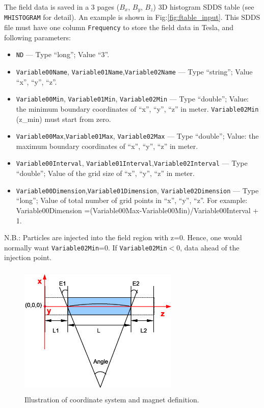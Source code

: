 The field data is saved in a 3 pages ($B_x$,
$B_y$, $B_z$) 3D histogram SDDS table (see \verb|MHISTOGRAM| for detail).
An example is shown in Fig:\ref{fig:ftable_input}.
This SDDS file must have one column \verb|Frequency| to store the
field data in Tesla, and following parameters:

\begin{itemize} 
\item \verb|ND| --- Type ``long''; Value ``3''.
\item \verb|Variable00Name|, \verb|Variable01Name|,\verb|Variable02Name| 
      --- Type ``string''; Value ``x'', ``y'', ``z''.
\item \verb|Variable00Min|, \verb|Variable01Min|, \verb|Variable02Min|
      --- Type ``double''; Value: the minimum boundary coordinates of
      ``x'', ``y'', ``z'' in meter. \verb|Variable02Min| (z\_min) must start from zero.
\item \verb|Variable00Max|,\verb|Variable01Max|, \verb|Variable02Max| 
      --- Type ``double''; Value: the maximum boundary coordinates of 
      ``x'', ``y'', ``z'' in meter.
\item \verb|Variable00Interval|, \verb|Variable01Interval|,\verb|Variable02Interval|
      --- Type ``double''; Value of the grid size of ``x'', ``y'', ``z'' in meter.  
\item \verb|Variable00Dimension|,\verb|Variable01Dimension|, \verb|Variable02Dimension|
      --- Type ``long''; Value of total number of grid points in
      ``x'', ``y'', ``z''.  For example: Variable00Dimension
      =(Variable00Max-Variable00Min)/Variable00Interval + 1.
\end{itemize}

N.B.: Particles are injected into the field region with z=0. Hence, one would normally want
\verb|Variable02Min|=0. If \verb|Variable02Min|$<$0, data ahead of the injection point.

\begin{figure}[htbp] 
  \begin{center}
  \includegraphics[width=3in,height=2.5in]{ftable-fig1.eps}
  \caption{\label{fig:ftable_mag} Illustration of coordinate
      system and magnet definition.}  
   \end{center} 
\end{figure}

